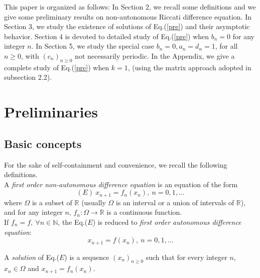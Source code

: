 \documentclass[11pt]{amsart}
\theoremstyle{definition}
\theoremstyle{remark}
\theoremstyle{example}
\numberwithin{equation}{section}
\begin{document}
This paper is organized as follows: In Section 2, we recall some definitions and we give some preliminary results
on non-autonomous Riccati difference equation. In Section 3, we study the existence of solutions of
Eq.(\ref{pre}) and their asymptotic behavior. Section 4 is devoted to detailed study of Eq.(\ref{pre}) when $b_n=0$ for
any integer $n$. In Section 5, we study the special case $b_n=0, a_n=d_n=1$, for all $n\geq0$, with $(c_n)_{n\geq0}$
not necessarily periodic. In the Appendix, we give a complete study of Eq.(\ref{pre}) when $k=1$, (using the matrix approach adopted in subsection 2.2).

\section{Preliminaries}

\subsection{ Basic concepts }

For the sake of self-containment and convenience, we recall the following definitions.\\
A \textit{first order non-autonomous difference equation} is an equation of the form
$$ (E) \ x_{n+1}=f_n(x_n), \ n=0,1,\ldots$$
 where $\Omega$ is a subset of $\mathbb{R}$ (usually $\Omega$ is an interval or a union of intervals of $\mathbb{R}$),
 and for any integer $n$,  $f_n : \Omega\rightarrow \mathbb{R}$ is a continuous function.\\
If $f_n=f, \ \forall n \in \mathbb{N}$, the Eq.($E$) is reduced to \textit{first order autonomous difference equation}:
$$x_{n+1}=f(x_n), \ n=0,1,\ldots$$

 A \textit{solution} of Eq.($E$) is a sequence $(x_n)_{n\geq0}$ such that for every integer $n$,
 $x_n \in \Omega$ and $x_{n+1}=f_n(x_n)$.
\end{document}
